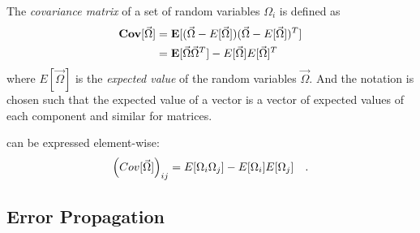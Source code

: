 The \emph{covariance matrix} of a set of random variables $\Omega_i$ is defined as
%
\begin{align}
    \mathbf{Cov}[\vec{\Omega}] &= \mathbf{E}[(\vec{\Omega} - E[\vec{\Omega}])(\vec{\Omega} - E[\vec{\Omega}])^T]
    \notag \\
    &= \mathbf{E}[\vec{\Omega}\vec{\Omega}^T] - E[\vec{\Omega}]E[\vec{\Omega}]^T
    \label{eq_def_cov}
\end{align}
%
where $E[\vec{\Omega}]$ is the \emph{expected value} of the random variables $\vec{\Omega}$. And the
notation is chosen such that the expected value of a vector is a vector
of expected values of each component and similar for matrices.

 can be expressed element-wise:
%
\begin{equation}
    \left(Cov[\vec{\Omega}]\right)_{ij} = E[\Omega_i\Omega_j] - E[\Omega_i]E[\Omega_j]
    \quad .
\end{equation}
%
\subsection{Error Propagation}

